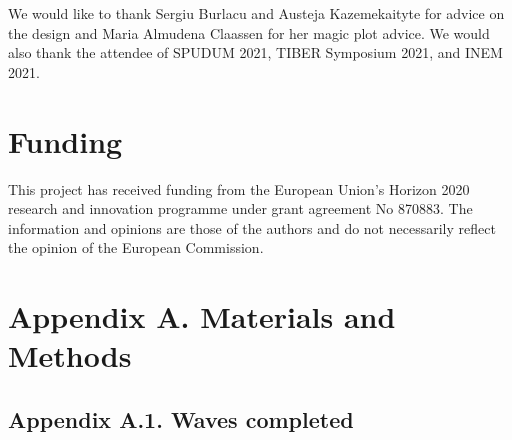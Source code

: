 \documentclass[authordate, empirical]{jote-new-article}
\begin{document}
	 We would like to thank Sergiu Burlacu and Austeja Kazemekaityte for advice on the design and Maria Almudena Claassen for her magic plot advice. We would also thank the attendee of SPUDUM 2021, TIBER Symposium 2021, and INEM 2021.


\section{Funding}
This project has received funding from the European Union's Horizon 2020 research and innovation programme under grant agreement No 870883. The information and opinions are those of the authors and do not necessarily reflect the opinion of the European Commission.

\printbibliography

\clearpage
\onecolumn
\appendix





	\section{Appendix A. Materials and Methods}



	\subsection{Appendix A.1. Waves completed}
\end{document}

